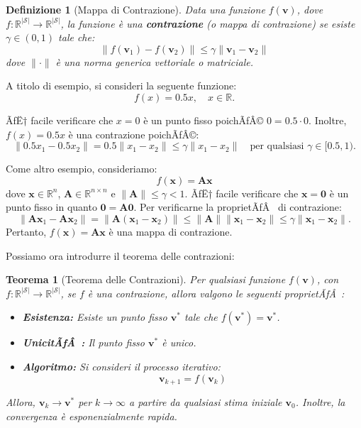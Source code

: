 ﻿\documentclass[11pt, a4paper]{report}
\newtheorem{theorem}{Teorema}
\newtheorem{definition}{Definizione}
\begin{document}
\begin{definition}[Mappa di Contrazione]
Data una funzione $f(\bm{v})$, dove $f : \mathbb{R}^{|\mathcal{S}|} \to \mathbb{R}^{|\mathcal{S}|}$, la funzione è una \textbf{contrazione} (o mappa di contrazione) se esiste $\gamma \in (0, 1)$ tale che:
\begin{equation}
\| f(\bm{v}_1) - f(\bm{v}_2) \| \le \gamma \| \bm{v}_1 - \bm{v}_2 \|
\end{equation}
dove $\|\cdot\|$ è una norma generica vettoriale o matriciale.
\end{definition}

A titolo di esempio, si consideri la seguente funzione:
\begin{equation}
f(x) = 0.5x, \quad x \in \mathbb{R}.
\end{equation}

\newpage

ÃƒË† facile verificare che $x = 0$ è un punto fisso poichÃƒÂ© $0 = 0.5 \cdot 0$. Inoltre, $f(x) = 0.5x$ è una contrazione poichÃƒÂ©:
\begin{equation}
\| 0.5x_1 - 0.5x_2 \| = 0.5 \| x_1 - x_2 \| \le \gamma \| x_1 - x_2 \| \quad \text{per qualsiasi } \gamma \in [0.5, 1).
\end{equation}

Come altro esempio, consideriamo:
\begin{equation}
f(\bm{x}) = \bm{A}\bm{x}
\end{equation}
dove $\bm{x} \in \mathbb{R}^n$, $\bm{A} \in \mathbb{R}^{n \times n}$ e $\|\bm{A}\| \le \gamma < 1$. ÃƒË† facile verificare che $\bm{x} = \bm{0}$ è un punto fisso in quanto $\bm{0} = \bm{A}\bm{0}$. Per verificarne la proprietÃƒÂ  di contrazione:
\begin{equation}
\| \bm{A}\bm{x}_1 - \bm{A}\bm{x}_2 \| = \| \bm{A}(\bm{x}_1 - \bm{x}_2) \| \le \| \bm{A} \| \| \bm{x}_1 - \bm{x}_2 \| \le \gamma \| \bm{x}_1 - \bm{x}_2 \|.
\end{equation}
Pertanto, $f(\bm{x}) = \bm{A}\bm{x}$ è una mappa di contrazione.

Possiamo ora introdurre il teorema delle contrazioni:

\begin{theorem}[Teorema delle Contrazioni]
Per qualsiasi funzione $f(\bm{v})$, con $f : \mathbb{R}^{|\mathcal{S}|} \to \mathbb{R}^{|\mathcal{S}|}$, se $f$ è una contrazione, allora valgono le seguenti proprietÃƒÂ :
\begin{itemize}[noitemsep]
    \item \textbf{Esistenza:} Esiste un punto fisso $\bm{v}^*$ tale che $f(\bm{v}^*) = \bm{v}^*$.
    \item \textbf{UnicitÃƒÂ :} Il punto fisso $\bm{v}^*$ è unico.
    \item \textbf{Algoritmo:} Si consideri il processo iterativo:
    \begin{equation}
    \bm{v}_{k+1} = f(\bm{v}_k)
    \end{equation}
\end{itemize}
Allora, $\bm{v}_k \to \bm{v}^*$ per $k \to \infty$ a partire da qualsiasi stima iniziale $\bm{v}_0$. Inoltre, la convergenza è esponenzialmente rapida.
\end{theorem}
\end{document}
